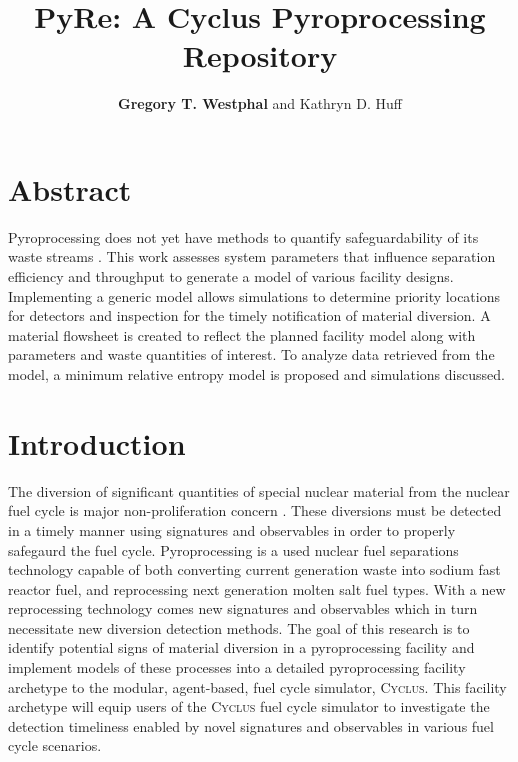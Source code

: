 \documentclass{anstrans}
\title{PyRe: A Cyclus Pyroprocessing Repository}
\author{\textbf{Gregory T. Westphal} and Kathryn D. Huff}
\institute{
Dept. of Nuclear, Plasma and Radiological Engineering, University of Illinois at Urbana-Champaign \\
gtw2@illinois.edu
}
\newcommand{\Cyclus}{\textsc{Cyclus}\xspace}%
\begin{document}
\section{Abstract}
Pyroprocessing does not yet have methods to quantify safeguardability of its waste streams \cite{Borrelli_2017}. This work assesses system parameters that influence separation efficiency and throughput to generate a model of various facility designs. Implementing a generic model allows simulations to determine priority locations for detectors and inspection for the timely notification of material diversion. A material flowsheet is created to reflect the planned facility model along with parameters and waste quantities of interest. To analyze data retrieved from the model, a minimum relative entropy model is proposed and simulations discussed.
\section{Introduction}
The diversion of significant quantities of special nuclear material from the nuclear fuel cycle is major non-proliferation concern \cite{noauthor_iaea_2017}. These diversions must be detected in a timely manner using signatures and observables in order to properly safegaurd the fuel cycle. Pyroprocessing is a used nuclear fuel separations technology capable of both converting current generation waste into sodium fast reactor fuel, and reprocessing next generation molten salt fuel types. With a new reprocessing technology comes new signatures and observables which in turn necessitate new diversion detection methods. The goal of this research is to identify potential signs of material diversion in a pyroprocessing facility and implement models of these processes into a detailed pyroprocessing facility archetype to the modular, agent-based, fuel cycle simulator, \Cyclus \cite{huff_fundamental_2016}. This facility archetype will equip users of the \Cyclus fuel cycle simulator to investigate the detection timeliness enabled by novel signatures and observables in various fuel cycle scenarios.
\end{document}
